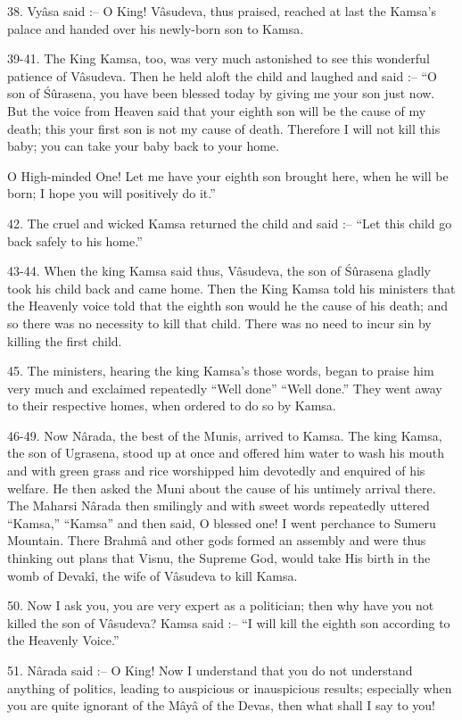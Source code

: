 38. Vy\^asa said :-- O King! V\^asudeva, thus praised, reached at last the Kamsa's palace and handed over his newly-born son to Kamsa.

39-41. The King Kamsa, too, was very much astonished to see this wonderful patience of V\^asudeva. Then he held aloft the child and laughed and said :-- ``O son of \'Sûrasena, you have been blessed today by giving me your son just now. But the voice from Heaven said that your eighth son will be the cause of my death; this your first son is not my cause of death. Therefore I will not kill this baby; you can take your baby back to your home.

O High-minded One! Let me have your eighth son brought here, when he will be born; I hope you will positively do it.''

42. The cruel and wicked Kamsa returned the child and said :-- ``Let this child go back safely to his home.''

43-44. When the king Kamsa said thus, V\^asudeva, the son of \'Sûrasena gladly took his child back and came home. Then the King Kamsa told his ministers that the Heavenly voice told that the eighth son would he the cause of his death; and so there was no necessity to kill that child. There was no need to incur sin by killing the first child.

45. The ministers, hearing the king Kamsa's those words, began to praise him very much and exclaimed repeatedly ``Well done'' ``Well done.'' They went away to their respective homes, when ordered to do so by Kamsa.

46-49. Now N\^arada, the best of the Munis, arrived to Kamsa. The king Kamsa, the son of Ugrasena, stood up at once and offered him water to wash his mouth and with green grass and rice worshipped him devotedly and enquired of his welfare. He then asked the Muni about the cause of his untimely arrival there. The Maharsi N\^arada then smilingly and with sweet words repeatedly uttered ``Kamsa,'' ``Kamsa'' and then said, O blessed one! I went perchance to Sumeru Mountain. There Brahm\^a and other gods formed an assembly and were thus thinking out plans that Visnu, the Supreme God, would take His birth in the womb of Devak\^i, the wife of V\^asudeva to kill Kamsa.

50. Now I ask you, you are very expert as a politician; then why have you not killed the son of V\^asudeva? Kamsa said :-- ``I will kill the eighth son according to the Heavenly Voice.''

51. N\^arada said :-- O King! Now I understand that you do not understand anything of politics, leading to auspicious or inauspicious results; especially when you are quite ignorant of the M\^ay\^a of the Devas, then what shall I say to you!

